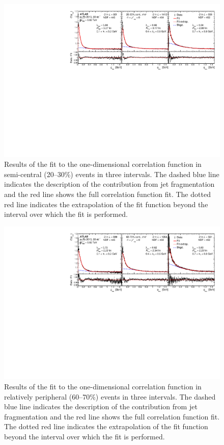 \begin{figure}[t]
\centering
\includegraphics[width=\linewidth]{Cqinv_kt_cent4_e3_kys1.pdf}
\caption{Results of the fit to the one-dimensional correlation function in semi-central (20--30\%) events in three \kt intervals.
The dashed blue line indicates the description of the contribution from jet fragmentation and the red line shows the full correlation function fit.
The dotted red line indicates the extrapolation of the fit function beyond the interval over which the fit is performed.
}
\label{fig:cqinv_cent4}
\end{figure}
\begin{figure}[t]
\centering
\includegraphics[width=\linewidth]{Cqinv_kt_cent8_e3_kys1.pdf}
\caption{Results of the fit to the one-dimensional correlation function in relatively peripheral (60--70\%) events in three \kt intervals.
The dashed blue line indicates the description of the contribution from jet fragmentation and the red line shows the full correlation function fit.
The dotted red line indicates the extrapolation of the fit function beyond the interval over which the fit is performed.
}
\label{fig:cqinv_cent8}
\end{figure}

